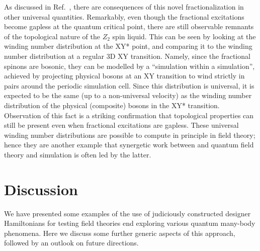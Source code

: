\documentclass[range]{ar2e}
\begin{document}
As discussed in Ref.~\cite{XYstarQMC}, there are consequences of this novel fractionalization in other universal quantities.  Remarkably, even though the fractional excitations become gapless at the quantum critical point, there are still observable remnants of the topological nature of the $Z_2$ spin liquid.  This can be seen by looking at the winding number distribution at the XY* point, and comparing it to the winding number distribution at a regular 3D XY transition.  Namely, since the fractional spinons are bosonic, they can be modelled by a ``simulation within a simulation'', achieved by projecting physical bosons at an XY transition to wind strictly in pairs around the periodic simulation cell.  Since this distribution is universal, it is expected to be the same (up to a non-universal velocity) as the winding number distribution of the physical (composite) bosons in the XY* transition.  Observation of this fact \cite{XYstarQMC} is a striking confirmation that topological properties can still be present even when fractional excitations are gapless.  These universal winding number distributions are possible to compute in principle in field theory; hence they are another example that synergetic work between and quantum field theory and simulation is often led by the latter.



\section{Discussion}
\label{sec:discussion}

We have presented some examples of the use of judiciously constructed designer Hamiltonians for testing field theories
end exploring various quantum many-body phenomena. Here we discuss some further generic aspects of this approach, followed by an 
outlook on future directions.
\end{document}
